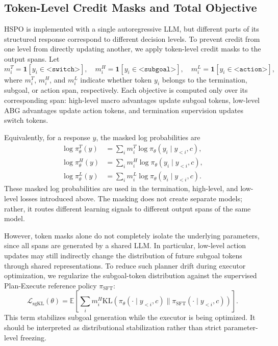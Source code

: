 \documentclass{article}
\newcommand{\wei}[1]{\textcolor{red}{#1}}
\begin{document}
\subsection{Token-Level Credit Masks and Total Objective}
\label{sec:token_masks}

HSPO is implemented with a single autoregressive LLM, but different parts of its structured response correspond to different decision levels. To prevent credit from one level from directly updating another, we apply token-level credit masks to the output spans. Let
\begin{equation}
m_i^T=\mathbf{1}[y_i\in \texttt{<switch>}],\quad
m_i^H=\mathbf{1}[y_i\in \texttt{<subgoal>}],\quad
m_i^L=\mathbf{1}[y_i\in \texttt{<action>}],
\label{eq:token_masks}
\end{equation}
where $m_i^T$, $m_i^H$, and $m_i^L$ indicate whether token $y_i$ belongs to the termination, subgoal, or action span, respectively. Each objective is computed only over its corresponding span: high-level macro advantages update subgoal tokens, low-level ABG advantages update action tokens, and termination supervision updates switch tokens.

Equivalently, for a response $y$, the masked log probabilities are
\begin{equation}
\begin{aligned}
\log \pi_\theta^T(y) &= \sum_i m_i^T \log \pi_\theta(y_i\mid y_{<i},c), \\
\log \pi_\theta^H(y) &= \sum_i m_i^H \log \pi_\theta(y_i\mid y_{<i},c), \\
\log \pi_\theta^L(y) &= \sum_i m_i^L \log \pi_\theta(y_i\mid y_{<i},c).
\end{aligned}
\label{eq:masked_logprob}
\end{equation}
These masked log probabilities are used in the termination, high-level, and low-level losses introduced above. The masking does not create separate models; rather, it routes different learning signals to different output spans of the same model.

However, token masks alone do not completely isolate the underlying parameters, since all spans are generated by a shared LLM. In particular, low-level action updates may still indirectly change the distribution of future subgoal tokens through shared representations. To reduce such planner drift during executor optimization, we regularize the subgoal-token distribution against the supervised Plan-Execute reference policy $\pi_{\mathrm{SFT}}$: %
\begin{equation}
\mathcal{L}_{\mathrm{sgKL}}(\theta)
=
\mathbb{E}
\left[
\sum_i m_i^H
\mathrm{KL}
\left(
\pi_\theta(\cdot\mid y_{<i},c)
\|
\pi_{\mathrm{SFT}}(\cdot\mid y_{<i},c)
\right)
\right].
\label{eq:subgoal_kl}
\end{equation}
This term stabilizes subgoal generation while the executor is being optimized. It should be interpreted as distributional stabilization rather than strict parameter-level freezing.
\end{document}
